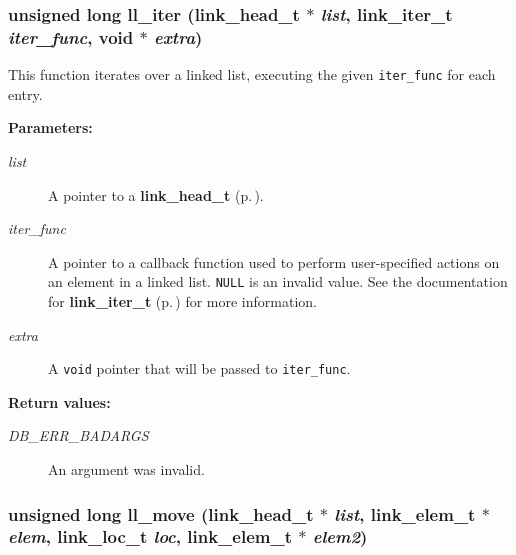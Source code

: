 \subsubsection{\setlength{\rightskip}{0pt plus 5cm}unsigned long ll\_\-iter ({\bf link\_\-head\_\-t} $\ast$ {\em list}, {\bf link\_\-iter\_\-t} {\em iter\_\-func}, void $\ast$ {\em extra})}\label{group__dbprim__link_a10}




 This function iterates over a linked list, executing the given {\tt iter\_\-func} for each entry.\begin{Desc}
\item[{\bf Parameters: }]\par
\begin{description}
\item[
{\em list}]A pointer to a {\bf link\_\-head\_\-t} {\rm (p.\,\pageref{group__dbprim__link_a0})}. \item[
{\em iter\_\-func}]A pointer to a callback function used to perform user-specified actions on an element in a linked list. {\tt NULL} is an invalid value. See the documentation for {\bf link\_\-iter\_\-t} {\rm (p.\,\pageref{group__dbprim__link_a2})} for more information. \item[
{\em extra}]A {\tt void} pointer that will be passed to {\tt iter\_\-func}.\end{description}
\end{Desc}
\begin{Desc}
\item[{\bf Return values: }]\par
\begin{description}
\item[
{\em DB\_\-ERR\_\-BADARGS}]An argument was invalid. \end{description}
\end{Desc}
\subsubsection{\setlength{\rightskip}{0pt plus 5cm}unsigned long ll\_\-move ({\bf link\_\-head\_\-t} $\ast$ {\em list}, {\bf link\_\-elem\_\-t} $\ast$ {\em elem}, {\bf link\_\-loc\_\-t} {\em loc}, {\bf link\_\-elem\_\-t} $\ast$ {\em elem2})}\label{group__dbprim__link_a7}




